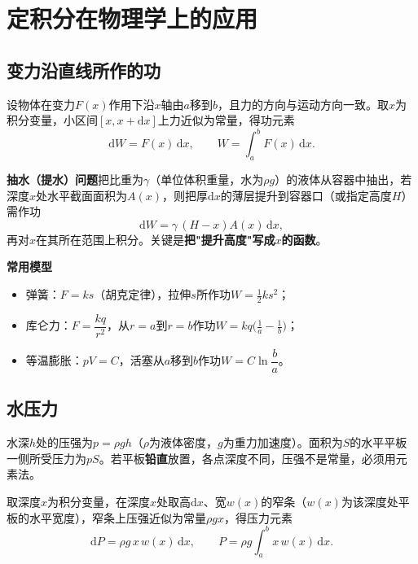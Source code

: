 

\section{定积分在物理学上的应用}

\subsection{变力沿直线所作的功}

设物体在变力$F(x)$作用下沿$x$轴由$a$移到$b$，且力的方向与运动方向一致。取$x$为积分变量，小区间$[x,x+\mathrm{d}x]$上力近似为常量，得功元素
\[
\mathrm{d}W=F(x)\,\mathrm{d}x ,
\qquad
W=\int_a^bF(x)\,\mathrm{d}x .
\]

\noindent\textbf{抽水（提水）问题}\quad 把比重为$\gamma$（单位体积重量，水为$\rho g$）的液体从容器中抽出，若深度$x$处水平截面面积为$A(x)$，则把厚$\mathrm{d}x$的薄层提升到容器口（或指定高度$H$）需作功
\[
\mathrm{d}W=\gamma\,(H-x)A(x)\,\mathrm{d}x ,
\]
再对$x$在其所在范围上积分。关键是\textbf{把"提升高度"写成$x$的函数}。

\noindent\textbf{常用模型}
\begin{itemize}
  \item 弹簧：$F=ks$（胡克定律），拉伸$s$所作功$W=\frac{1}{2}ks^2$；
  \item 库仑力：$F=\dfrac{kq}{r^2}$，从$r=a$到$r=b$作功$W=kq\bigl(\frac1a-\frac1b\bigr)$；
  \item 等温膨胀：$pV=C$，活塞从$a$移到$b$作功$W=C\ln\dfrac{b}{a}$。
\end{itemize}

\subsection{水压力}

水深$h$处的压强为$p=\rho gh$（$\rho$为液体密度，$g$为重力加速度）。面积为$S$的水平平板一侧所受压力为$pS$。若平板\textbf{铅直}放置，各点深度不同，压强不是常量，必须用元素法。

\noindent 取深度$x$为积分变量，在深度$x$处取高$\mathrm{d}x$、宽$w(x)$的窄条（$w(x)$为该深度处平板的水平宽度），窄条上压强近似为常量$\rho gx$，得压力元素
\[
\mathrm{d}P=\rho g\,x\,w(x)\,\mathrm{d}x ,
\qquad
P=\rho g\int_a^bx\,w(x)\,\mathrm{d}x .
\]

